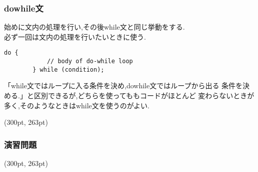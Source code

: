 \documentclass[dvipdfmx]{beamer}
\begin{document}
\subtitle{do while文}
\begin{frame}[c, fragile, label=31]
    \frametitle{do\space while文}
    始めに文内の処理を行い,その後while文と同じ挙動をする.\\
    必ず一回は文内の処理を行いたいときに使う.
    \begin{lstlisting}[gobble=6, caption=Syntax\space of\space do\space while\space loop, label=dowhile_howto]
        do {
            // body of do-while loop
        } while (condition);
    \end{lstlisting}
    「while文ではループに入る条件を決め,do\space while文ではループから出る
    条件を決める.」と区別できるが,どちらを使ってももコードがほとんど
    変わらないときが多く,そのようなときはwhile文を使うのがよい.
    \begin{textblock*}{0.3\linewidth}(300pt, 263pt)
    \hyperlink{30}{}
    \space
    \hyperlink{32}{}
    \end{textblock*}
\end{frame}

\begin{frame}[t, fragile, label=32]
    \frametitle{演習問題}
    \begin{textblock*}{0.3\linewidth}(300pt, 263pt)
    \hyperlink{31}{}
    \space
    \hyperlink{33}{}
    \end{textblock*}
\end{frame}
\end{document}
